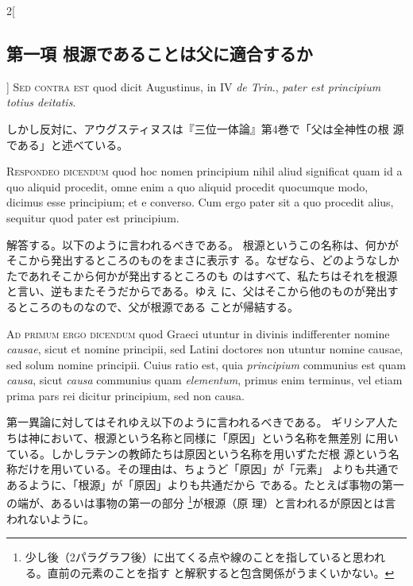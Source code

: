\documentclass[paper=a4paper,fontsize=10pt,jafontsize=9pt,titlepage]{jlreq}
\begin{document}
\begin{paracol}{2}[\subsection{第一項 根源であることは父に適合するか}]
{\scshape Sed contra est} quod dicit Augustinus, in IV {\itshape de Trin}., {\itshape pater est
principium totius deitatis}.


\switchcolumn


しかし反対に、アウグスティヌスは『三位一体論』第4巻で「父は全神性の根
 源である」と述べている。




{\scshape Respondeo dicendum} quod hoc nomen principium nihil aliud significat
quam id a quo aliquid procedit, omne enim a quo aliquid procedit
quocumque modo, dicimus esse principium; et e converso. Cum ergo pater
sit a quo procedit alius, sequitur quod pater est principium.


\switchcolumn


解答する。以下のように言われるべきである。
根源というこの名称は、何かがそこから発出するところのものをまさに表示す
 る。なぜなら、どのようなしかたであれそこから何かが発出するところのも
 のはすべて、私たちはそれを根源と言い、逆もまたそうだからである。ゆえ
 に、父はそこから他のものが発出するところのものなので、父が根源である
 ことが帰結する。


\switchcolumn*[\subsection{ad.1}]


{\scshape Ad primum ergo dicendum} quod Graeci utuntur in divinis indifferenter
nomine {\itshape causae}, sicut et nomine principii, sed Latini doctores non
utuntur nomine causae, sed solum nomine principii. Cuius ratio est,
quia {\itshape principium} communius est quam {\itshape causa}, sicut {\itshape causa} communius quam
{\itshape elementum}, primus enim terminus, vel etiam prima pars rei dicitur
principium, sed non causa.


\switchcolumn


第一異論に対してはそれゆえ以下のように言われるべきである。
ギリシア人たちは神において、根源という名称と同様に「原因」という名称を無差別
 に用いている。しかしラテンの教師たちは原因という名称を用いずただ根
 源という名称だけを用いている。その理由は、ちょうど「原因」が「元素」
 よりも共通であるように、「根源」が「原因」よりも共通だから
 である。たとえば事物の第一の端が、あるいは事物の第一の部分
 \footnote{少し後（2パラグラフ後）に出てくる点や線のことを指していると思われる。直前の元素のことを指す
 と解釈すると包含関係がうまくいかない。}が根源（原
 理）と言われるが原因とは言われないように。



\end{paracol}
\end{document}
